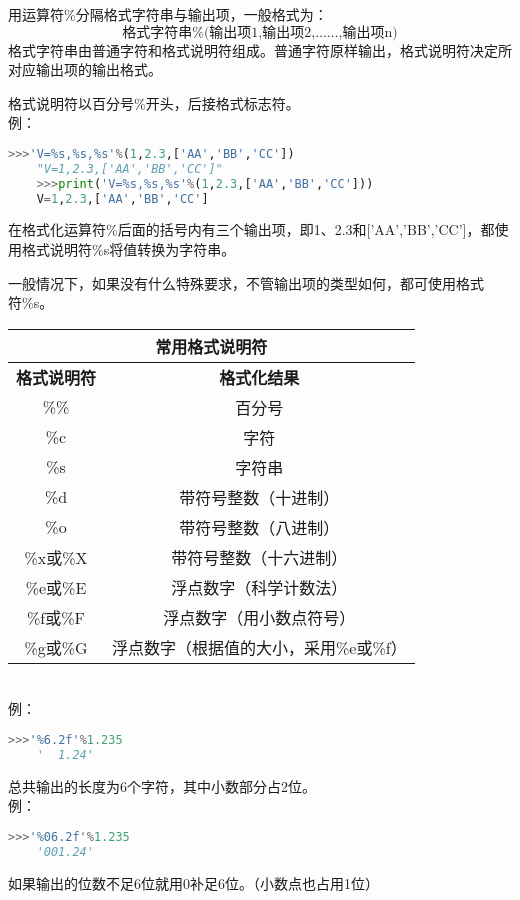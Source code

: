 \documentclass[11pt,a4paper]{article}
\begin{document}
用运算符\%分隔格式字符串与输出项，一般格式为：
$$\mbox{格式字符串\%(输出项1,输出项2,……,输出项n)}$$
格式字符串由普通字符和格式说明符组成。普通字符原样输出，格式说明符决定所对应输出项的输出格式。

格式说明符以百分号\%开头，后接格式标志符。\\
例：
\begin{lstlisting}[language={Python}]
    >>>'V=%s,%s,%s'%(1,2.3,['AA','BB','CC'])
    "V=1,2.3,['AA','BB','CC']"
    >>>print('V=%s,%s,%s'%(1,2.3,['AA','BB','CC']))
    V=1,2.3,['AA','BB','CC']
\end{lstlisting}

在格式化运算符\%后面的括号内有三个输出项，即1、2.3和['AA','BB','CC']，都使用格式说明符\%s将值转换为字符串。

一般情况下，如果没有什么特殊要求，不管输出项的类型如何，都可使用格式符\%s。
\begin{table}[]
    \centering
    \begin{tabular}{|cc|}
        \hline
        \multicolumn{2}{|c|}{\textbf{常用格式说明符}}                                      \\ \hline
        \multicolumn{1}{|c|}{\textbf{格式说明符}} & \textbf{格式化结果}                    \\ \hline
        \multicolumn{1}{|c|}{\%\%}                & 百分号                                 \\ \hline
        \multicolumn{1}{|c|}{\%c}                 & 字符                                   \\ \hline
        \multicolumn{1}{|c|}{\%s}                 & 字符串                                 \\ \hline
        \multicolumn{1}{|c|}{\%d}                 & 带符号整数（十进制）                   \\ \hline
        \multicolumn{1}{|c|}{\%o}                 & 带符号整数（八进制）                   \\ \hline
        \multicolumn{1}{|c|}{\%x或\%X}            & 带符号整数（十六进制）                 \\ \hline
        \multicolumn{1}{|c|}{\%e或\%E}            & 浮点数字（科学计数法）                 \\ \hline
        \multicolumn{1}{|c|}{\%f或\%F}            & 浮点数字（用小数点符号）               \\ \hline
        \multicolumn{1}{|c|}{\%g或\%G}            & 浮点数字（根据值的大小，采用\%e或\%f） \\ \hline
    \end{tabular}
\end{table}~{}\\
例：
\begin{lstlisting}[language={Python}]
    >>>'%6.2f'%1.235
    '  1.24'
\end{lstlisting}
总共输出的长度为6个字符，其中小数部分占2位。\\
例：
\begin{lstlisting}[language={Python}]
    >>>'%06.2f'%1.235
    '001.24'
\end{lstlisting}
如果输出的位数不足6位就用0补足6位。（小数点也占用1位）
\end{document}
